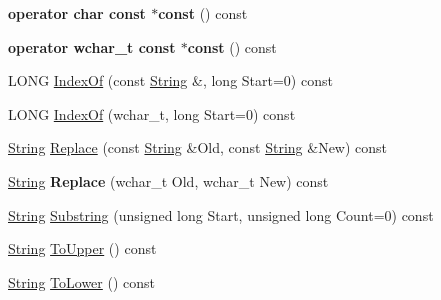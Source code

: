 \begin{DoxyCompactItemize}
\mbox{\label{class_canberra_1_1_utility_1_1_core_1_1_string_a68af818b7d48a9fd6dec0af2a9629f35}} 
{\bfseries operator char const $\ast$const} () const
\item 
\mbox{\label{class_canberra_1_1_utility_1_1_core_1_1_string_aa5484ed1af47eac86fb8b74e23848509}} 
{\bfseries operator wchar\+\_\+t const $\ast$const} () const
\item 
L\+O\+NG \hyperlink{class_canberra_1_1_utility_1_1_core_1_1_string_a457223b9476260d7b372bb16546d1433_a457223b9476260d7b372bb16546d1433}{Index\+Of} (const \hyperlink{class_canberra_1_1_utility_1_1_core_1_1_string}{String} \&, long Start=0) const
\item 
L\+O\+NG \hyperlink{class_canberra_1_1_utility_1_1_core_1_1_string_acc06ef1245c083575c0a96144efda0d1_acc06ef1245c083575c0a96144efda0d1}{Index\+Of} (wchar\+\_\+t, long Start=0) const
\item 
\hyperlink{class_canberra_1_1_utility_1_1_core_1_1_string}{String} \hyperlink{class_canberra_1_1_utility_1_1_core_1_1_string_a857ddfe9f2276b3a4ee060b281dc8c52_a857ddfe9f2276b3a4ee060b281dc8c52}{Replace} (const \hyperlink{class_canberra_1_1_utility_1_1_core_1_1_string}{String} \&Old, const \hyperlink{class_canberra_1_1_utility_1_1_core_1_1_string}{String} \&New) const
\item 
\mbox{\label{class_canberra_1_1_utility_1_1_core_1_1_string_a1029f435d10f502fd4d7bf00b4c7a34d}} 
\hyperlink{class_canberra_1_1_utility_1_1_core_1_1_string}{String} {\bfseries Replace} (wchar\+\_\+t Old, wchar\+\_\+t New) const
\item 
\hyperlink{class_canberra_1_1_utility_1_1_core_1_1_string}{String} \hyperlink{class_canberra_1_1_utility_1_1_core_1_1_string_a5e9c70c1fbed98b6b04917bde6e71759_a5e9c70c1fbed98b6b04917bde6e71759}{Substring} (unsigned long Start, unsigned long Count=0) const
\item 
\hyperlink{class_canberra_1_1_utility_1_1_core_1_1_string}{String} \hyperlink{class_canberra_1_1_utility_1_1_core_1_1_string_aaec177c997a9bffbe90e4c5150802d9c_aaec177c997a9bffbe90e4c5150802d9c}{To\+Upper} () const
\item 
\hyperlink{class_canberra_1_1_utility_1_1_core_1_1_string}{String} \hyperlink{class_canberra_1_1_utility_1_1_core_1_1_string_a21375ea3dfb78cc46e30ce95ae6a17bf_a21375ea3dfb78cc46e30ce95ae6a17bf}{To\+Lower} () const

\end{DoxyCompactItemize}
